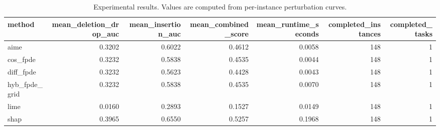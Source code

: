 \begin{table}[t]
\caption{Experimental results. Values are computed from per-instance perturbation curves.}
\label{tab:main_results_computed}
\centering
\begin{tabular}{lrrrrrr}
\toprule
method & mean\_deletion\_drop\_auc & mean\_insertion\_auc & mean\_combined\_score & mean\_runtime\_seconds & completed\_instances & completed\_tasks \\
\midrule
aime & 0.3202 & 0.6022 & 0.4612 & 0.0058 & 148 & 1 \\
cos\_fpde & 0.3232 & 0.5838 & 0.4535 & 0.0044 & 148 & 1 \\
diff\_fpde & 0.3232 & 0.5623 & 0.4428 & 0.0043 & 148 & 1 \\
hyb\_fpde\_grid & 0.3232 & 0.5838 & 0.4535 & 0.0070 & 148 & 1 \\
lime & 0.0160 & 0.2893 & 0.1527 & 0.0149 & 148 & 1 \\
shap & 0.3965 & 0.6550 & 0.5257 & 0.1968 & 148 & 1 \\
\bottomrule
\end{tabular}

\end{table}

